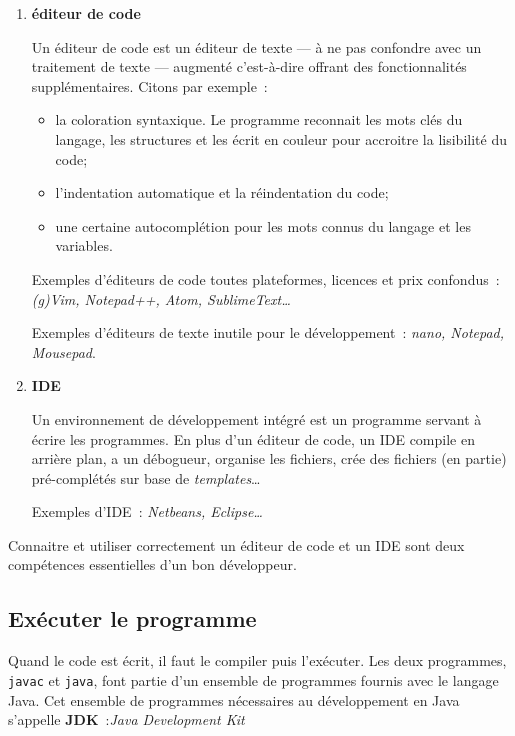 \begin{enumerate}
	\item \textbf{éditeur de code}

		Un éditeur de code est un éditeur de texte — à ne pas confondre avec un
		traitement de texte — augmenté c'est-à-dire offrant des fonctionnalités
		supplémentaires. Citons par exemple~:

		\begin{itemize}

			\item la coloration syntaxique. Le programme reconnait les mots clés
				du langage, les structures et les écrit en couleur pour
				accroitre la lisibilité du code;

			\item l'indentation automatique et la réindentation du code;

			\item une certaine autocomplétion pour les mots connus du langage 
				et les variables.

		\end{itemize}

		Exemples d'éditeurs de code toutes plateformes, licences et prix
		confondus~: {\itshape (g)Vim, Notepad++, Atom, SublimeText…}
	
		Exemples d'éditeurs de texte inutile pour le développement~: {\itshape
		nano, Notepad, Mousepad}.


	\item \textbf{IDE}

		Un environnement de développement intégré est un programme servant à 
		écrire les programmes. En plus d'un éditeur de code, un IDE compile 
		en arrière plan, a un débogueur, organise les fichiers, crée des fichiers
		(en partie) pré-complétés sur base de \textit{templates}…

		Exemples d'IDE~: {\itshape Netbeans, Eclipse… }

\end{enumerate}

Connaitre et utiliser correctement un éditeur de code et un IDE sont deux
compétences essentielles d'un bon développeur.

\subsection{Exécuter le programme}

Quand le code est écrit, il faut le compiler puis l'exécuter. Les deux
programmes, \texttt{javac} et \texttt{java}, font partie d'un ensemble de
programmes fournis avec le langage Java. Cet ensemble de programmes nécessaires
au développement en Java s'appelle \textbf{JDK}~:\textit{Java Development Kit}

